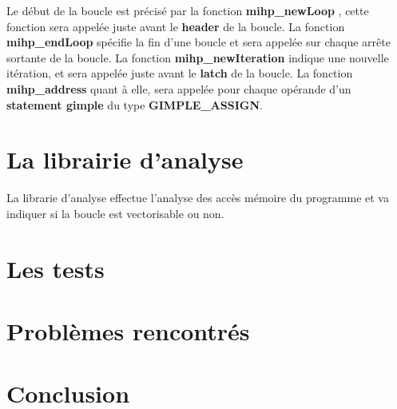 \documentclass[12pt,french]{article}
\begin{document}
Le début de la boucle est précisé par la fonction
\textbf{mihp\_newLoop}
, cette fonction sera appelée juste avant le \textbf{header} de la boucle. La fonction \textbf{mihp\_endLoop} spécifie la fin d'une boucle et sera appelée sur chaque arrête sortante de la boucle. La fonction \textbf{mihp\_newIteration} indique une nouvelle itération, et sera appelée juste avant le
\textbf{latch} de la boucle. La fonction \textbf{mihp\_address} quant à elle, sera appelée pour chaque opérande d'un \textbf{statement gimple} du type \textbf{GIMPLE\_ASSIGN}.

\section{\color{blue}La librairie d'analyse}

La librarie d'analyse effectue l'analyse des accès mémoire du programme et va indiquer si la boucle est vectorisable ou non.

\section{\color{blue}Les tests}



\section{\color{blue}Problèmes rencontrés}



\section{\color{blue}Conclusion}
\end{document}
